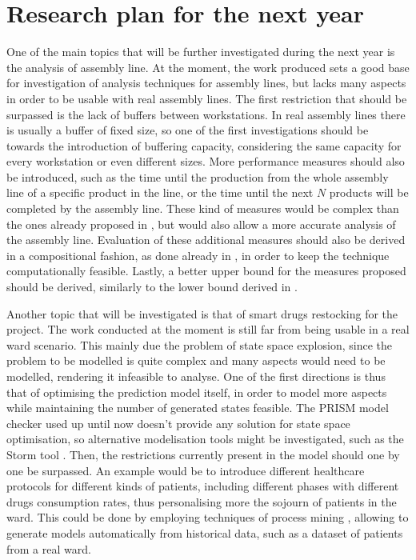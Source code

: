 
\section*{Research plan for the next year}

  One of the main topics that will be further investigated during the next year is the analysis of assembly line. At the moment, the work produced \cite{biagi2017inspection} sets a good base for investigation of analysis techniques for assembly lines, but lacks many aspects in order to be usable with real assembly lines. The first restriction that should be surpassed is the lack of buffers between workstations. In real assembly lines there is usually a buffer of fixed size, so one of the first investigations should be towards the introduction of buffering capacity, considering the same capacity for every workstation or even different sizes. More performance measures should also be introduced, such as the time until the production from the whole assembly line of a specific product in the line, or the time until the next $N$ products will be completed by the assembly line. These kind of measures would be complex than the ones already proposed in \cite{biagi2017inspection}, but would also allow a more accurate analysis of the assembly line. Evaluation of these additional measures should also be derived in a compositional fashion, as done already in \cite{biagi2017inspection}, in order to keep the technique computationally feasible. Lastly, a better upper bound for the measures proposed should be derived, similarly to the lower bound derived in \cite{biagi2017inspection}.
  
  Another topic that will be investigated is that of smart drugs restocking for the  project. The work conducted at the moment is still far from being usable in a real ward scenario. This mainly due the problem of state space explosion, since the problem to be modelled is quite complex and many aspects would need to be modelled, rendering it infeasible to analyse. One of the first directions is thus that of optimising the prediction model itself, in order to model more aspects while maintaining the number of generated states feasible. The PRISM model checker used up until now doesn't provide any solution for state space optimisation, so alternative modelisation tools might be investigated, such as the Storm tool \cite{dehnert2017storm}. Then, the restrictions currently present in the model should one by one be surpassed. An example would be to introduce different healthcare protocols for different kinds of patients, including different phases with different drugs consumption rates, thus personalising more the sojourn of patients in the ward. This could be done by employing techniques of process mining \cite{van2004workflow}, allowing to generate models automatically from historical data, such as a dataset of patients from a real ward.
  

